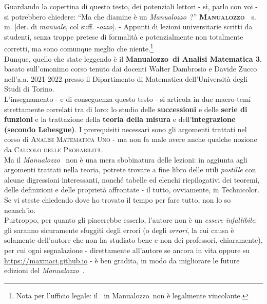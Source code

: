 \noindent Guardando la copertina di questo testo, dei potenziali lettori - sì, parlo con voi - si potrebbero chiedere: ``Ma che diamine è un \textit{Manualozzo\texttrademark\ }?''
\vspace{3mm}
\lettrine[findent=1pt, nindent=0pt]{\textbf{M}}{\textbf{anualozzo\texttrademark\ }} s. m. [der. di \textit{manuale}, col suff. \textit{-ozzo}]. - Appunti di lezioni universitarie scritti da studenti, senza troppe pretese di formalità e potenzialmente non totalmente corretti, ma sono comunque meglio che niente.\footnote{Nota per l'ufficio legale: il \texttrademark\ in Manualozzo\texttrademark\ non è legalmente vincolante.}
\vspace{3mm}\\
Dunque, quello che state leggendo è il \textbf{Manualozzo\texttrademark\  di Analisi Matematica 3}, basato sull'omonimo corso tenuto dai docenti Walter Dambrosio e Davide Zucco nell'a.a. 2021-2022 presso il Dipartimento di Matematica dell'Università degli Studi di Torino.\\
L'insegnamento - e di conseguenza questo testo - si articola in due macro-temi strettamente correlati tra di loro: lo studio delle \textbf{successioni} e delle \textbf{serie di funzioni} e la trattazione della \textbf{teoria della misura} e dell'\textbf{integrazione (secondo Lebesgue)}. I prerequisiti necessari sono gli argomenti trattati nel corso di \textsc{Analisi Matematica Uno} - ma non fa male avere anche qualche nozione da \textsc{Calcolo delle Probabilità}.\\
Ma il \textit{Manualozzo\texttrademark\ } non è una mera sbobinatura delle lezioni: in aggiunta agli argomenti trattati nella teoria, potrete trovare a fine libro delle utili \textit{postille} con alcune digressioni interessanti, nonché tabelle ed elenchi riepilogativi dei teoremi, delle definizioni e delle proprietà affrontate - il tutto, ovviamente, in Technicolor\texttrademark. {\small Se vi steste chiedendo dove ho trovato il tempo per fare tutto, non lo so neanch'io.}\\
Purtroppo, per quanto gli piacerebbe esserlo, l'autore non è un \textit{essere infallibile}: gli saranno sicuramente sfuggiti degli errori (o degli \textit{orrori}, la cui causa è solamente dell'autore che non ha studiato bene e non dei professori, chiaramente), per cui ogni segnalazione - direttamente all'autore se ancora in vita oppure su \textcolor{redill}{\url{https://maxmaci.github.io}} - è ben gradita, in modo da migliorare le future edizioni del \textit{Manualozzo\texttrademark\ }.

